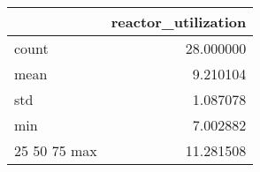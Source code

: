 \begin{tabular}{lr}
\toprule
 & reactor\_utilization \\
\midrule
count & 28.000000 \\
mean & 9.210104 \\
std & 1.087078 \\
min & 7.002882 \\
25%
50%
75%
max & 11.281508 \\
\bottomrule
\end{tabular}

